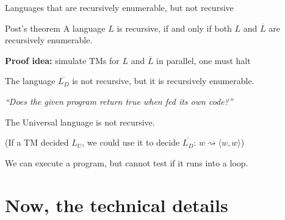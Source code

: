 \documentclass[handout]{beamer}
\begin{document}
\begin{frame}{Languages that are recursively enumerable, but not recursive}

    \begin{block}{Post's theorem}
        A language $L$ is recursive, if and only if both $L$ and $\overline{L}$ are recursively enumerable.
    \end{block}
    
    \vspace{-6pt}
    \textbf{Proof idea:} simulate TMs for $L$ and $\overline{L}$ in parallel, one must halt
    \vspace{6pt}

    \begin{corollary}
        The language $\overline{L_D}$ is not recursive, but it is recursively enumerable.
    \end{corollary}

    \vspace{-6pt}
    {\it ``Does the given program return true when fed its own code?''}
    \vspace{6pt}

    \begin{corollary}
        The Universal language is not recursive.
    \end{corollary}
    
    \vspace{-6pt}
    (If a TM decided $L_U$, we could use it to decide $\overline{L_D}$: $w\rightsquigarrow\langle w,w\rangle$)
    \vspace{9pt}

    We can execute a program, but cannot test if it runs into a loop.    

\end{frame}


\section*{Now, the technical details}
\end{document}
